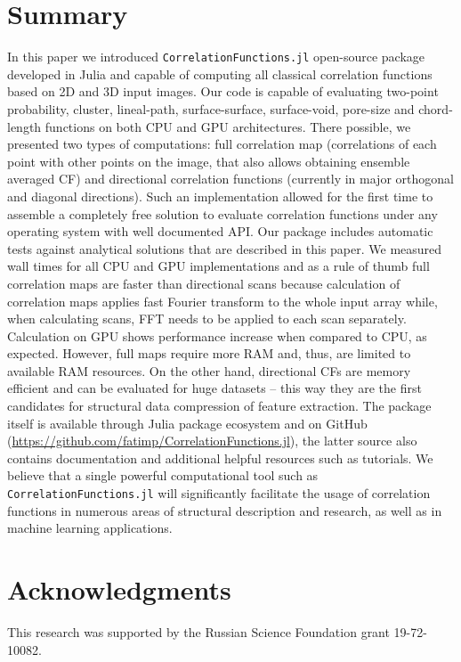 \documentclass[1p]{elsarticle}
\newcommand{\code}[1]{\colorbox{light-gray}{\texttt{#1}}}
\begin{document}
\section{Summary}
\label{sec:summary}
In this paper we introduced \code{CorrelationFunctions.jl} open-source package
developed in Julia and capable of computing all classical correlation functions
based on 2D and 3D input images. Our code is capable of evaluating two-point
probability, cluster, lineal-path, surface-surface, surface-void, pore-size and
chord-length functions on both CPU and GPU architectures. There possible, we
presented two types of computations: full correlation map (correlations of each
point with other points on the image, that also allows obtaining ensemble
averaged CF) and directional correlation functions (currently in major
orthogonal and diagonal directions). Such an implementation allowed for the
first time to assemble a completely free solution to evaluate correlation
functions under any operating system with well documented API. Our package
includes automatic tests against analytical solutions that are described in this
paper. We measured wall times for all CPU and GPU implementations and as a rule
of thumb full correlation maps are faster than directional scans because
calculation of correlation maps applies fast Fourier transform to the whole
input array while, when calculating scans, FFT needs to be applied to each scan
separately. Calculation on GPU shows performance increase when compared to CPU,
as expected.  However, full maps require more RAM and, thus, are limited to
available RAM resources. On the other hand, directional CFs are memory efficient
and can be evaluated for huge datasets -- this way they are the first candidates
for structural data compression of feature extraction. The package itself is
available through Julia package ecosystem and on GitHub
(\url{https://github.com/fatimp/CorrelationFunctions.jl}), the latter source also
contains documentation and additional helpful resources such as tutorials.  We
believe that a single powerful computational tool such as
\code{CorrelationFunctions.jl} will significantly facilitate the usage of
correlation functions in numerous areas of structural description and research,
as well as in machine learning applications.

\section{Acknowledgments}
This research was supported by the Russian Science Foundation grant 19-72-10082.
\end{document}
